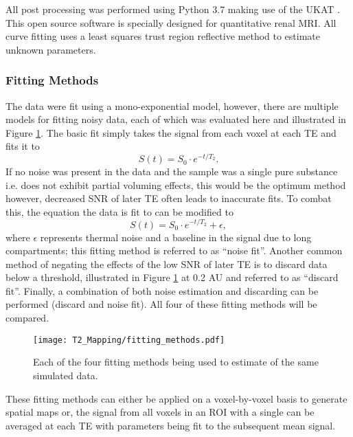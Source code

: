 All post processing was performed using Python 3.7 making use of the \ac{UKAT} \cite{daniel_ukrin_2021, nery_ukrin_2020}. This open source software is specially designed for quantitative renal \ac{MRI}. All curve fitting uses a least squares trust region reflective method to estimate unknown parameters.

\subsubsection{\ttwo Fitting Methods}

The data were fit using a mono-exponential model, however, there are multiple models for fitting noisy data, each of which was evaluated here and illustrated in Figure \ref{fig:t2_fitting_methods}. The basic fit simply takes the signal from each voxel at each \ac{TE} and fits it to 
\begin{equation}
	S(t) = S_0 \cdot e^{-t/T_2}.
	\label{eq:t2}
\end{equation}
If no noise was present in the data and the sample was a single pure substance i.e. does not exhibit partial voluming effects, this would be the optimum method however, decreased SNR of later \ac{TE} often leads to inaccurate fits. To combat this, the equation the data is fit to can be modified to
\begin{equation}
	S(t) = S_0 \cdot e^{-t/T_2} + \epsilon,
	\label{eq:t2_noise}
\end{equation}
where $\epsilon$ represents thermal noise and a baseline in the signal due to long \ttwo compartments; this fitting method is referred to as ``noise fit''. Another common method of negating the effects of the low \ac{SNR} of later \ac{TE} is to discard data below a threshold, illustrated in Figure \ref{fig:t2_fitting_methods} at 0.2 AU and referred to as ``discard fit''. Finally, a combination of both noise estimation and discarding can be performed (discard and noise fit). All four of these fitting methods will be compared.

\begin{figure}[H]
	\centering
	\texttt{[image: T2\_Mapping/fitting\_methods.pdf]}
	\caption{Each of the four fitting methods being used to estimate \ttwo of the same simulated data.}
	\label{fig:t2_fitting_methods}	
\end{figure}

These fitting methods can either be applied on a voxel-by-voxel basis to generate spatial maps or, the signal from all voxels in an \ac{ROI} with a single \ttwo can be averaged at each \ac{TE} with parameters being fit to the subsequent mean signal. 

